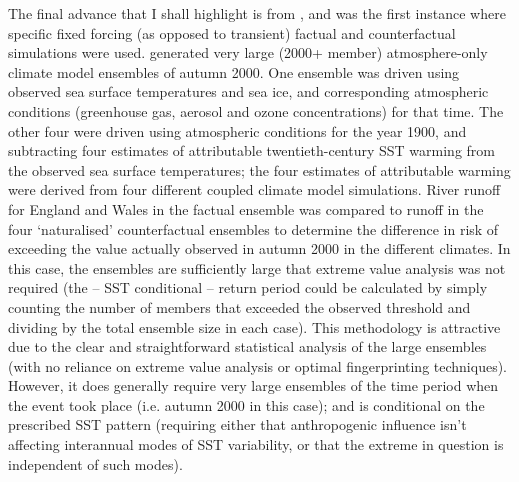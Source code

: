     The final advance that I shall highlight is from \citet{pall_anthropogenic_2011}, and was the first instance where specific fixed forcing (as opposed to transient) factual and counterfactual simulations were used. \citeauthor{pall_anthropogenic_2011} generated very large (2000+ member) atmosphere-only climate model ensembles of autumn 2000. One ensemble was driven using observed sea surface temperatures and sea ice, and corresponding atmospheric conditions (greenhouse gas, aerosol and ozone concentrations) for that time. The other four were driven using atmospheric conditions for the year 1900, and subtracting four estimates of attributable twentieth-century SST warming from the observed sea surface temperatures; the four estimates of attributable warming were derived from four different coupled climate model simulations. River runoff for England and Wales in the factual ensemble was compared to runoff in the four `naturalised' counterfactual ensembles to determine the difference in risk of exceeding the value actually observed in autumn 2000 in the different climates. In this case, the ensembles are sufficiently large that extreme value analysis was not required (the -- SST conditional -- return period could be calculated by simply counting the number of members that exceeded the observed threshold and dividing by the total ensemble size in each case). This methodology is attractive due to the clear and straightforward statistical analysis of the large ensembles (with no reliance on extreme value analysis or optimal fingerprinting techniques). However, it does generally require very large ensembles of the time period when the event took place (i.e. autumn 2000 in this case); and is conditional on the prescribed SST pattern (requiring either that anthropogenic influence isn't affecting interannual modes of SST variability, or that the extreme in question is independent of such modes).

